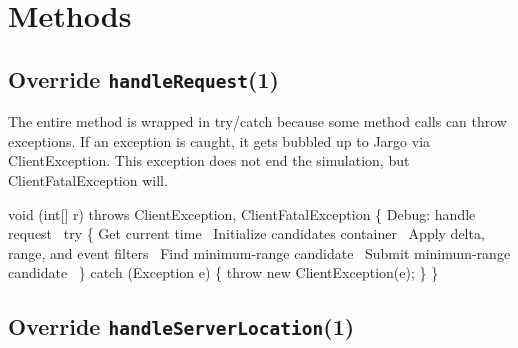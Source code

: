 \section{Methods}
\label{NearestNeighbor: methods}

\subsection{Override \texttt{handleRequest}(1)}

The entire method is wrapped in try/catch because some method calls can throw
exceptions. If an exception is caught, it gets bubbled up to Jargo via
{\Tt{}ClientException\nwendquote}. This exception does not end the simulation, but
{\Tt{}ClientFatalException\nwendquote} will.

\nwenddocs{}\plusendmoddef\nwstartdeflinemarkup{}\nwenddeflinemarkup
void (int[] r) throws ClientException, ClientFatalException \{
  \LA{}Debug: handle request~{\nwtagstyle{}}\RA{}
  try \{
    \LA{}Get current time~{\nwtagstyle{}}\RA{}
    \LA{}Initialize candidates container~{\nwtagstyle{}}\RA{}
    \LA{}Apply delta, range, and event filters~{\nwtagstyle{}}\RA{}
    \LA{}Find minimum-range candidate~{\nwtagstyle{}}\RA{}
    \LA{}Submit minimum-range candidate~{\nwtagstyle{}}\RA{}
  \} catch (Exception e) \{
    throw new ClientException(e);
  \}
\}
\eatline
{}\nwendcode{}\nwdocspar
\subsection{Override \texttt{handleServerLocation}(1)}

